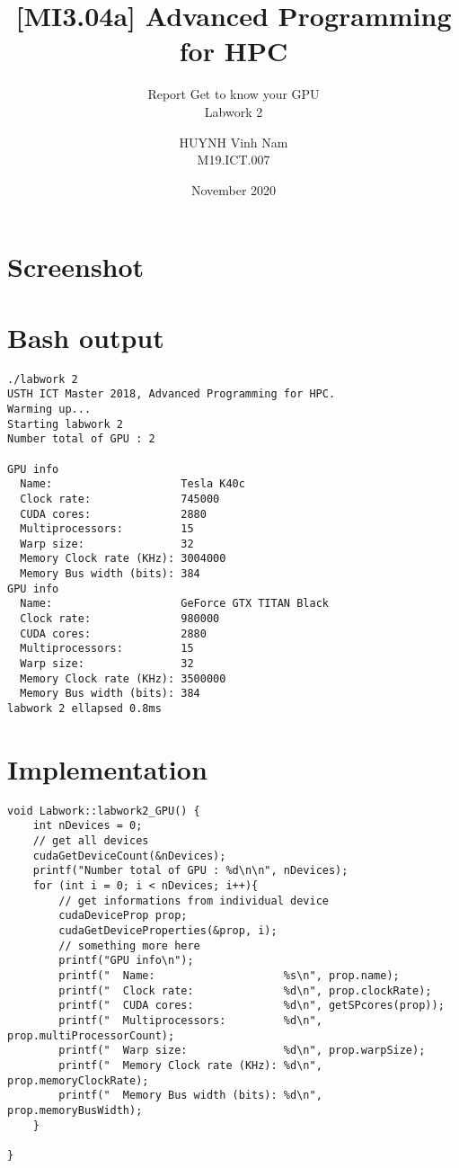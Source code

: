 \documentclass[10pt, a4paper]{article}
\title{[MI3.04a] Advanced Programming for HPC}
\subtitle{Report Get to know your GPU \\ Labwork 2}
\author{HUYNH Vinh Nam \\ M19.ICT.007}
\date{November 2020}
\begin{document}
\maketitle


\section{Screenshot}
    \begin{center}
        \begin{figure}[H]
            \centering
            \label{fig:gpu-devices}
        \end{figure}
    \end{center}
    
\clearpage

\hfill \hfill
\section{Bash output}
    \begin{verbatim}
./labwork 2
USTH ICT Master 2018, Advanced Programming for HPC.
Warming up...
Starting labwork 2
Number total of GPU : 2

GPU info
  Name:                    Tesla K40c
  Clock rate:              745000
  CUDA cores:              2880
  Multiprocessors:         15
  Warp size:               32
  Memory Clock rate (KHz): 3004000
  Memory Bus width (bits): 384
GPU info
  Name:                    GeForce GTX TITAN Black
  Clock rate:              980000
  CUDA cores:              2880
  Multiprocessors:         15
  Warp size:               32
  Memory Clock rate (KHz): 3500000
  Memory Bus width (bits): 384
labwork 2 ellapsed 0.8ms    
    \end{verbatim}

\clearpage

\hfill \hfill
\section{Implementation}

\begin{verbatim}
void Labwork::labwork2_GPU() {
    int nDevices = 0;
    // get all devices
    cudaGetDeviceCount(&nDevices);
    printf("Number total of GPU : %d\n\n", nDevices);
    for (int i = 0; i < nDevices; i++){
        // get informations from individual device
        cudaDeviceProp prop;
        cudaGetDeviceProperties(&prop, i);
        // something more here
        printf("GPU info\n");
        printf("  Name:                    %s\n", prop.name);  
        printf("  Clock rate:              %d\n", prop.clockRate);
        printf("  CUDA cores:              %d\n", getSPcores(prop));
        printf("  Multiprocessors:         %d\n", prop.multiProcessorCount);
        printf("  Warp size:               %d\n", prop.warpSize);
        printf("  Memory Clock rate (KHz): %d\n", prop.memoryClockRate);
        printf("  Memory Bus width (bits): %d\n", prop.memoryBusWidth); 
    }

}
\end{verbatim}
\end{document}
